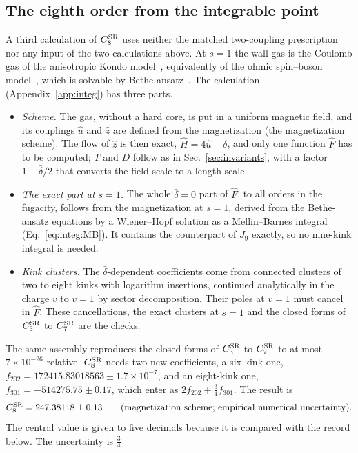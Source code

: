 \documentclass[11pt,a4paper]{article}
\numberwithin{equation}{section}
\newcommand{\CSR}{C^{\rm SR}}
\newcommand{\db}{\bar\delta}
\newcommand{\sci}[2]{#1\times10^{#2}}
\begin{document}
\subsection{The eighth order from the integrable point}\label{sec:integ}
A third calculation of $\CSR_8$ uses neither the matched two-coupling prescription nor any input of the two
calculations above. At $s=1$ the wall gas is the Coulomb gas of the anisotropic Kondo model~\cite{Anderson:1969xx,Anderson:1970kyb}, equivalently of the ohmic spin--boson model~\cite{Leggett:1987zz}, which is solvable by Bethe
ansatz~\cite{Andrei:1983,Tsvelick:1983}. The calculation (Appendix~\ref{app:integ}) has three parts.
\begin{itemize}
\item \emph{Scheme.} The gas, without a hard core, is put in a uniform magnetic field, and its couplings $\hat u$ and
 $\hat z$ are defined from the magnetization (the magnetization scheme). The flow of $\hat z$ is then exact,
 $\hat H=4\hat u-\db$, and only one function $\hat F$ has to be computed; $T$ and $D$ follow as in
 Sec.~\ref{sec:invariants}, with a factor $1-\db/2$ that converts the field scale to a length scale.
\item \emph{The exact part at $s=1$.} The whole $\db=0$ part of $\hat F$, to all orders in the fugacity, follows from
 the magnetization at $s=1$, derived from the Bethe-ansatz equations by a Wiener--Hopf solution as a Mellin--Barnes
 integral (Eq.~\eqref{eq:integ:MB}). It contains the counterpart of $J_9$ exactly, so no nine-kink integral is needed.
\item \emph{Kink clusters.} The $\db$-dependent coefficients come from connected clusters of two to eight kinks with
 logarithm insertions, continued analytically in the charge $v$ to $v=1$ by sector decomposition. Their poles at $v=1$
 must cancel in $\hat F$. These cancellations, the exact clusters at $s=1$ and the closed forms of $\CSR_3$ to $\CSR_7$
 are the checks.
\end{itemize}
The same assembly reproduces the closed forms of $\CSR_3$ to $\CSR_7$ to at most $\sci{7}{-26}$ relative. $\CSR_8$ needs
two new coefficients, a six-kink one, $f_{202}=172415.83018563\pm\sci{1.7}{-7}$, and an eight-kink one,
$f_{301}=-514275.75\pm0.17$, which enter as $2f_{202}+\frac34f_{301}$. The result is
\begin{equation}
 \CSR_8=247.38118\pm0.13\qquad(\text{magnetization scheme; empirical numerical uncertainty}).
 \label{eq:C8integ}
\end{equation}
The central value is given to five decimals because it is compared with the record below. The uncertainty is $\frac34$
\end{document}
